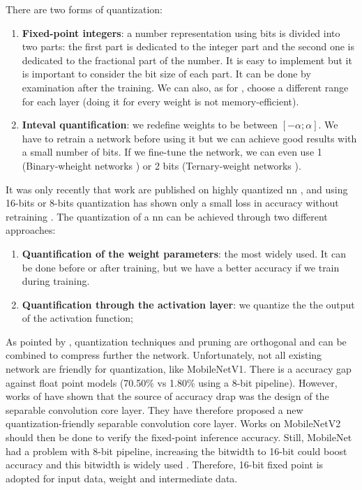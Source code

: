 There are two forms of quantization:
\begin{enumerate}
    \item \textbf{Fixed-point integers}: a number representation using bits is divided into two parts: the first part is dedicated to the integer part and the second one is dedicated to the fractional part of the number. It is easy to implement but it is important to consider the bit size of each part. It can be done by examination after the training. We can also, as for \cite{qiu_going_2016, yin_high_2018}, choose a different range for each layer (doing it for every weight is not memory-efficient).
    \item \textbf{Inteval quantification}: we redefine weights to be between $[-\alpha; \alpha]$. We have to retrain a network before using it but we can achieve good results with a small number of bits. If we fine-tune the network, we can even use 1 (Binary-wheight networks \cite{courbariaux_binarized_2016}) or 2 bits (Ternary-weight networks \cite{li_ternary_2016}).
\end{enumerate}
%
It was only recently that work are published on highly quantized \acrshort{nn} \cite{guo_survey_2018}, and using 16-bits or 8-bits quantization has shown only a small loss in accuracy without retraining \cite{abdelouahab_accelerating_2018}. The quantization of a \acrshort{nn} can be achieved through two different approaches:
\begin{enumerate}
    \item \textbf{Quantification of the weight parameters}: the most widely used. It can be done before or after training, but we have a better accuracy if we train during training.
    \item \textbf{Quantification through the activation layer}: we quantize the the output of the activation function;
\end{enumerate}
As pointed by \textcite{han_deep_2016}, quantization techniques and pruning are orthogonal and can be combined to compress further the network. Unfortunately, not all existing network are friendly for quantization, like MobileNetV1. There is a accuracy gap against float point models (70.50\% vs 1.80\% using a 8-bit pipeline). However, works of \textcite{sheng_quantization-friendly_2018} have shown that the source of accuracy drap was the design of the separable convolution core layer. They have therefore proposed a new quantization-friendly separable convolution core layer. Works on MobileNetV2 should then be done to verify the fixed-point inference accuracy. Still, MobileNet had a problem with 8-bit pipeline, increasing the bitwidth to 16-bit could boost accuracy \cite{cheng_recent_2018} and this bitwidth is widely used \cite{huimin_li_high_2016, bai_cnn_2018}. Therefore, 16-bit fixed point is adopted for input data, weight and intermediate data.
